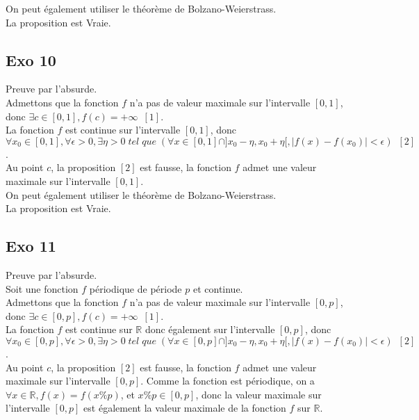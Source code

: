 \documentclass[]{book}
\theoremstyle{definition}
\newcommand{\bb}[1]{\mathbb{#1}}
\newcommand{\R}{\bb{R}}
\begin{document}
On peut \'egalement utiliser le th\'eor\`eme de Bolzano-Weierstrass.\\

La proposition est Vraie.

\subsection*{Exo 10}
Preuve par l'absurde. \\

Admettons que la fonction $f$ n'a pas de valeur maximale sur l'intervalle $[0,1]$, donc $\exists c \in [0,1], f(c) = +\infty\,\,\,[1]$.\\

La fonction $f$ est continue sur l'intervalle $[0,1]$, donc $\forall x_0 \in [0,1], \forall \epsilon >0, \exists \eta > 0\; tel\; que\; (\forall x \in [0,1] \cap ]x_0-\eta, x_0+\eta[, |f(x)-f(x_0)| < \epsilon)\,\,\,[2]$. \\ 

Au point $c$, la proposition $[2]$ est fausse, la fonction $f$ admet une valeur maximale sur l'intervalle $[0,1]$.\\


On peut \'egalement utiliser le th\'eor\`eme de Bolzano-Weierstrass.\\

La proposition est Vraie.


\subsection*{Exo 11}
Preuve par l'absurde. \\

Soit une fonction $f$ p\'eriodique de p\'eriode $p$ et continue. \\

Admettons que la fonction $f$ n'a pas de valeur maximale sur l'intervalle $[0,p]$, donc $\exists c \in [0,p], f(c) = +\infty\,\,\,[1]$.\\

La fonction $f$ est continue sur $\R$ donc \'egalement sur l'intervalle $[0,p]$, donc $\forall x_0 \in [0,p], \forall \epsilon >0, \exists \eta > 0\; tel\; que\; (\forall x \in [0,p] \cap ]x_0-\eta, x_0+\eta[, |f(x)-f(x_0)| < \epsilon)\,\,\,[2]$. \\ 

Au point $c$, la proposition $[2]$ est fausse, la fonction $f$ admet une valeur maximale sur l'intervalle $[0,p]$. Comme la fonction est p\'eriodique, on a $\forall x \in \R, f(x) = f(x\%p)$, et $x\%p \in [0,p]$, donc la valeur maximale sur l'intervalle $[0,p]$ est \'egalement la valeur maximale de la fonction $f$ sur $\R$. \\
\end{document}
